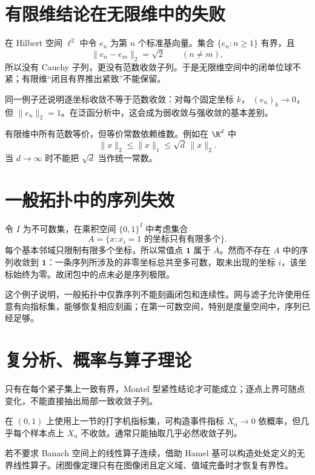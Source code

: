 \section{有限维结论在无限维中的失败}

在 Hilbert 空间 \(\ell^2\) 中令 \(e_n\) 为第 \(n\) 个标准基向量。集合
\(\{e_n:n\ge1\}\) 有界，且
\[
 \|e_n-e_m\|_2=\sqrt2\qquad(n\ne m),
\]
所以没有 Cauchy 子列，更没有范数收敛子列。于是无限维空间中的闭单位球不紧；有限维“闭且有界推出紧致”不能保留。

同一例子还说明逐坐标收敛不等于范数收敛：对每个固定坐标 \(k\)，
\((e_n)_k\to0\)，但 \(\|e_n\|_2=1\)。在泛函分析中，这会成为弱收敛与强收敛的基本差别。

有限维中所有范数等价，但等价常数依赖维数。例如在 \(\R^d\) 中
\[
 \|x\|_2\le\|x\|_1\le\sqrt d\,\|x\|_2.
\]
当 \(d\to\infty\) 时不能把 \(\sqrt d\) 当作统一常数。

\section{一般拓扑中的序列失效}

令 \(I\) 为不可数集，在乘积空间 \(\{0,1\}^I\) 中考虑集合
\[
 A=\{x:x_i=1\text{ 的坐标只有有限多个}\}.
\]
每个基本邻域只限制有限多个坐标，所以常值点 \(\mathbf1\) 属于
\(\overline A\)。然而不存在 \(A\) 中的序列收敛到 \(\mathbf1\)：一条序列所涉及的非零坐标总共至多可数，取未出现的坐标 \(i\)，该坐标始终为零。故闭包中的点未必是序列极限。

这个例子说明，一般拓扑中仅靠序列不能刻画闭包和连续性。网与滤子允许使用任意有向指标集，能够恢复相应刻画；在第一可数空间，特别是度量空间中，序列已经足够。

\section{复分析、概率与算子理论}

\begin{description}[style=nextline,leftmargin=2.8em]
 \item[逐点模有界不控制全纯函数列]
 只有在每个紧子集上一致有界，Montel 型紧性结论才可能成立；逐点上界可随点变化，不能直接抽出局部一致收敛子列。

 \item[依概率收敛不推出几乎必然收敛]
 在 \((0,1)\) 上使用上一节的打字机指标集，可构造事件指标
 \(X_n\to0\) 依概率，但几乎每个样本点上 \(X_n\) 不收敛。通常只能抽取几乎必然收敛子列。

 \item[处处定义的线性算子未必有界]
 若不要求 Banach 空间上的线性算子连续，借助 Hamel 基可以构造处处定义的无界线性算子。闭图像定理只有在图像闭且定义域、值域完备时才恢复有界性。
\end{description}

